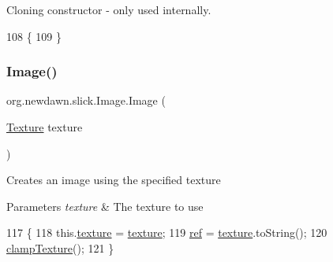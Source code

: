 Cloning constructor -\/ only used internally. 
\begin{DoxyCode}
108                       \{
109     \}
\end{DoxyCode}
\mbox{\label{classorg_1_1newdawn_1_1slick_1_1_image_a637c81c808dead29cf487b79445a4364}} 
\subsubsection{\texorpdfstring{Image()}{Image()}\hspace{0.1cm}{\footnotesize\ttfamily [3/16]}}
{\footnotesize\ttfamily org.\+newdawn.\+slick.\+Image.\+Image (\begin{DoxyParamCaption}\item[{\mbox{\hyperlink{interfaceorg_1_1newdawn_1_1slick_1_1opengl_1_1_texture}{Texture}}}]{texture }\end{DoxyParamCaption})\hspace{0.3cm}{\ttfamily [inline]}}

Creates an image using the specified texture


\begin{DoxyParams}{Parameters}
{\em texture} & The texture to use \\
\hline
\end{DoxyParams}

\begin{DoxyCode}
117                                   \{
118         this.\mbox{\hyperlink{classorg_1_1newdawn_1_1slick_1_1_image_a9fd9ddb21247305c83ac4e37d9d51f79}{texture}} = \mbox{\hyperlink{classorg_1_1newdawn_1_1slick_1_1_image_a9fd9ddb21247305c83ac4e37d9d51f79}{texture}};
119         \mbox{\hyperlink{classorg_1_1newdawn_1_1slick_1_1_image_a32694687591a80299d8b8ad1ea070cee}{ref}} = \mbox{\hyperlink{classorg_1_1newdawn_1_1slick_1_1_image_a9fd9ddb21247305c83ac4e37d9d51f79}{texture}}.toString();
120         \mbox{\hyperlink{classorg_1_1newdawn_1_1slick_1_1_image_a18d37e5c346d316dda2fc5a523d43422}{clampTexture}}();
121     \}
\end{DoxyCode}
\mbox{\label{classorg_1_1newdawn_1_1slick_1_1_image_a9bf642123ace0c4086bf8f0ab15570af}} 
